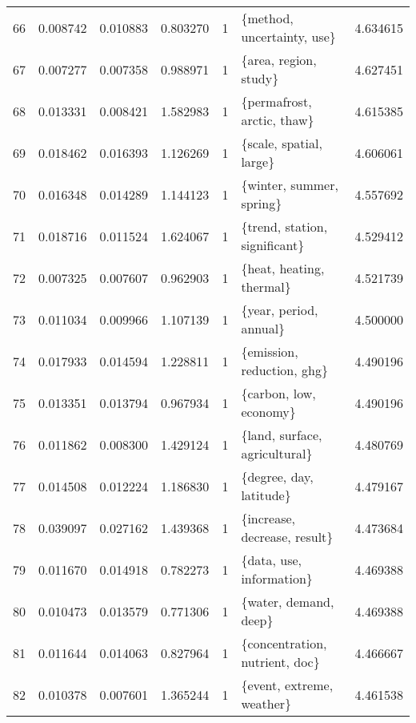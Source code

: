 \begin{tabular}{lrrrrlr}
66 &    0.008742 &  0.010883 &        0.803270 &           1 &              \{method, uncertainty, use\} &  4.634615 \\
67 &    0.007277 &  0.007358 &        0.988971 &           1 &                   \{area, region, study\} &  4.627451 \\
68 &    0.013331 &  0.008421 &        1.582983 &           1 &              \{permafrost, arctic, thaw\} &  4.615385 \\
69 &    0.018462 &  0.016393 &        1.126269 &           1 &                 \{scale, spatial, large\} &  4.606061 \\
70 &    0.016348 &  0.014289 &        1.144123 &           1 &                \{winter, summer, spring\} &  4.557692 \\
71 &    0.018716 &  0.011524 &        1.624067 &           1 &           \{trend, station, significant\} &  4.529412 \\
72 &    0.007325 &  0.007607 &        0.962903 &           1 &                \{heat, heating, thermal\} &  4.521739 \\
73 &    0.011034 &  0.009966 &        1.107139 &           1 &                  \{year, period, annual\} &  4.500000 \\
74 &    0.017933 &  0.014594 &        1.228811 &           1 &              \{emission, reduction, ghg\} &  4.490196 \\
75 &    0.013351 &  0.013794 &        0.967934 &           1 &                  \{carbon, low, economy\} &  4.490196 \\
76 &    0.011862 &  0.008300 &        1.429124 &           1 &           \{land, surface, agricultural\} &  4.480769 \\
77 &    0.014508 &  0.012224 &        1.186830 &           1 &                 \{degree, day, latitude\} &  4.479167 \\
78 &    0.039097 &  0.027162 &        1.439368 &           1 &            \{increase, decrease, result\} &  4.473684 \\
79 &    0.011670 &  0.014918 &        0.782273 &           1 &                \{data, use, information\} &  4.469388 \\
80 &    0.010473 &  0.013579 &        0.771306 &           1 &                   \{water, demand, deep\} &  4.469388 \\
81 &    0.011644 &  0.014063 &        0.827964 &           1 &          \{concentration, nutrient, doc\} &  4.466667 \\
82 &    0.010378 &  0.007601 &        1.365244 &           1 &               \{event, extreme, weather\} &  4.461538 \\

\end{tabular}
